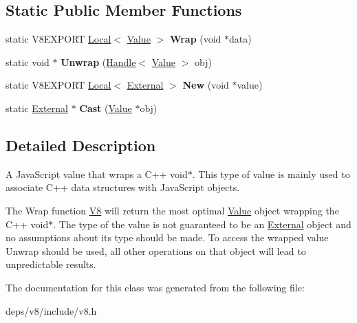 \subsection*{Static Public Member Functions}
\begin{DoxyCompactItemize}
\item 
\hypertarget{classv8_1_1_external_ae22c392d352c75ebded75092337aaedd}{}static V8\+E\+X\+P\+O\+R\+T \hyperlink{classv8_1_1_local}{Local}$<$ \hyperlink{classv8_1_1_value}{Value} $>$ {\bfseries Wrap} (void $\ast$data)\label{classv8_1_1_external_ae22c392d352c75ebded75092337aaedd}

\item 
\hypertarget{classv8_1_1_external_a8a3d966cf493d986adb7a53a17651a8b}{}static void $\ast$ {\bfseries Unwrap} (\hyperlink{classv8_1_1_handle}{Handle}$<$ \hyperlink{classv8_1_1_value}{Value} $>$ obj)\label{classv8_1_1_external_a8a3d966cf493d986adb7a53a17651a8b}

\item 
\hypertarget{classv8_1_1_external_ae4ff3030216c7fd1a27db59aae5d2e39}{}static V8\+E\+X\+P\+O\+R\+T \hyperlink{classv8_1_1_local}{Local}$<$ \hyperlink{classv8_1_1_external}{External} $>$ {\bfseries New} (void $\ast$value)\label{classv8_1_1_external_ae4ff3030216c7fd1a27db59aae5d2e39}

\item 
\hypertarget{classv8_1_1_external_a4711aba26710c5dd72f11cb81808f9c2}{}static \hyperlink{classv8_1_1_external}{External} $\ast$ {\bfseries Cast} (\hyperlink{classv8_1_1_value}{Value} $\ast$obj)\label{classv8_1_1_external_a4711aba26710c5dd72f11cb81808f9c2}

\end{DoxyCompactItemize}


\subsection{Detailed Description}
A Java\+Script value that wraps a C++ void$\ast$. This type of value is mainly used to associate C++ data structures with Java\+Script objects.

The Wrap function \hyperlink{classv8_1_1_v8}{V8} will return the most optimal \hyperlink{classv8_1_1_value}{Value} object wrapping the C++ void$\ast$. The type of the value is not guaranteed to be an \hyperlink{classv8_1_1_external}{External} object and no assumptions about its type should be made. To access the wrapped value Unwrap should be used, all other operations on that object will lead to unpredictable results. 

The documentation for this class was generated from the following file\+:\begin{DoxyCompactItemize}
\item 
deps/v8/include/v8.\+h\end{DoxyCompactItemize}
